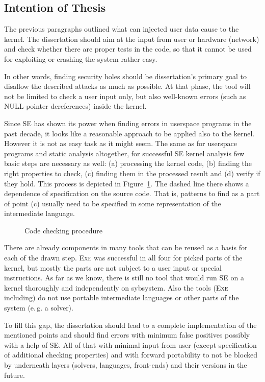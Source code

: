 \documentclass[11pt,a4paper]{article}
\begin{document}
\subsection{Intention of Thesis}
The previous paragraphs outlined what can injected user data cause to
the kernel. The dissertation should aim at the input from user or hardware
(network) and check whether there are proper tests in the code, so that it
cannot be used for exploiting or crashing the system rather easy.

In other words, finding security holes should be dissertation's primary goal
to disallow the described attacks as much as possible. At that phase, the tool
will not be limited to check a user input only, but also well-known errors
(such as NULL-pointer dereferences) inside the kernel.

Since SE has shown its power when finding errors in userspace programs in the
past decade, it looks like a reasonable approach to be applied also to the
kernel. However it is not as easy task as it might seem. The same as for
userspace programs and static analysis altogether, for successful SE kernel
analysis few basic steps are necessary as well: (a) processing the kernel
code, (b) finding the right properties to check, (c) finding them in the
processed result and (d) verify if they hold. This process is depicted in
Figure~\ref{fig_code_process}. The dashed line there shows a dependence of
specification on the source code. That is, patterns to find as a part of
point (c) usually need to be specified in some representation of the
intermediate language.

\begin{figure}[htb]
\begin{center}

\caption{Code checking procedure}
\label{fig_code_process}
\end{center}
\end{figure}

There are already components in many tools that can be reused as a basis for
each of the drawn step. \textsc{Exe} was successful in all four for picked
parts of the kernel, but mostly the parts are not subject to a user input or
special instructions. As far as we know, there is still no tool that would run
SE on a kernel thoroughly and independently on sybsystem. Also the tools
(\textsc{Exe} including) do not use portable intermediate languages or other
parts of the system (e.\,g. a solver).

To fill this gap, the dissertation should lead to a complete implementation
of the mentioned points and should find errors with minimum false positives
possibly with a help of SE. All of that with minimal input from user (except
specification of additional checking properties) and with forward portability
to not be blocked by underneath layers (solvers, languages, front-ends) and
their versions in the future.
\end{document}
